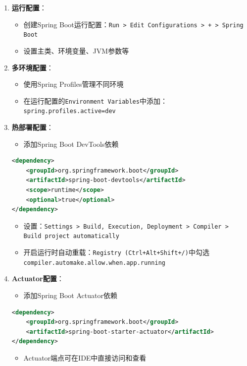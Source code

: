 \begin{enumerate}
\def\labelenumi{\arabic{enumi}.}
\tightlist
\item
  \textbf{运行配置}：

  \begin{itemize}
  \tightlist
  \item
    创建Spring
    Boot运行配置：\passthrough{\lstinline!Run > Edit Configurations > + > Spring Boot!}
  \item
    设置主类、环境变量、JVM参数等
  \end{itemize}
\item
  \textbf{多环境配置}：

  \begin{itemize}
  \tightlist
  \item
    使用Spring Profiles管理不同环境
  \item
    在运行配置的\passthrough{\lstinline!Environment Variables!}中添加：\passthrough{\lstinline!spring.profiles.active=dev!}
  \end{itemize}
\item
  \textbf{热部署配置}：

  \begin{itemize}
  \tightlist
  \item
    添加Spring Boot DevTools依赖
  \end{itemize}

\begin{lstlisting}[language=XML]
<dependency>
    <groupId>org.springframework.boot</groupId>
    <artifactId>spring-boot-devtools</artifactId>
    <scope>runtime</scope>
    <optional>true</optional>
</dependency>
\end{lstlisting}

  \begin{itemize}
  \tightlist
  \item
    设置：\passthrough{\lstinline!Settings > Build, Execution, Deployment > Compiler > Build project automatically!}
  \item
    开启运行时自动重载：\passthrough{\lstinline!Registry (Ctrl+Alt+Shift+/)!}中勾选\passthrough{\lstinline!compiler.automake.allow.when.app.running!}
  \end{itemize}
\item
  \textbf{Actuator配置}：

  \begin{itemize}
  \tightlist
  \item
    添加Spring Boot Actuator依赖
  \end{itemize}

\begin{lstlisting}[language=XML]
<dependency>
    <groupId>org.springframework.boot</groupId>
    <artifactId>spring-boot-starter-actuator</artifactId>
</dependency>
\end{lstlisting}

  \begin{itemize}
  \tightlist
  \item
    Actuator端点可在IDE中直接访问和查看
  \end{itemize}
\end{enumerate}

